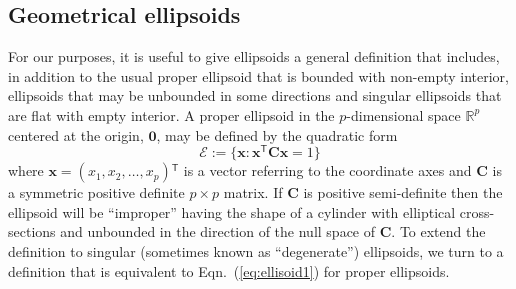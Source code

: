\documentclass[11pt]{article}%
\renewcommand*{\eqref}[1]{Eqn.~(\ref{#1})}
\renewcommand*{\vec}[1]{\ensuremath{\bm{#1}}}
\newcommand{\trans}{\ensuremath{^\mathsf{T}}}
\newcommand*{\mat}[1]{\ensuremath{\bm{#1}}}
\newcommand*{\Real}[1]{\mathbb{R}^{#1}}
\begin{document}
\subsection{Geometrical ellipsoids}
For our purposes, it is useful to give ellipsoids a general definition that includes, in addition to the usual proper ellipsoid that is bounded with non-empty interior,  ellipsoids that may be unbounded in some directions and singular ellipsoids that are flat with empty interior.
%
%
%
A proper ellipsoid in the $p$-dimensional space $\Real{p}$
centered at the origin, $\vec{0}$,
may be defined by the quadratic form
\begin{equation}\label{eq:ellisoid1}
\mathcal{E} := \{ \vec{x}: \vec{x}\trans \mat{C} \vec{x} =1 \}
\end{equation}
where $\vec{x} = (x_1, x_2, \dots , x_p)\trans$ is a vector referring to the coordinate axes and $\mat{C}$ is a symmetric 
positive definite $p \times p$ matrix. 
If $\mat{C}$ is positive semi-definite then the ellipsoid will be ``improper'' having the shape of a cylinder with elliptical cross-sections and unbounded in the direction of the null space of $\mat{C}$.
To extend the definition to singular (sometimes known as ``degenerate'') ellipsoids, we turn to a definition that is equivalent to \eqref{eq:ellisoid1} for proper ellipsoids.   
\end{document}
